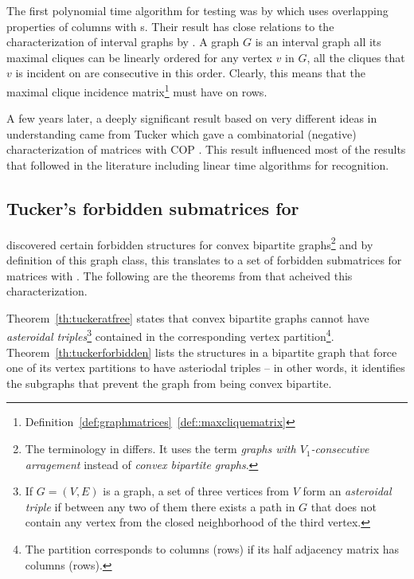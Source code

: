 The first polynomial time algorithm for \COP testing was by
\cite{fg65} which uses overlapping properties of columns with \un
s. Their result has close relations to the characterization of
interval graphs by \cite{gh64}. A graph $G$ is an interval graph \iff
all its maximal cliques can be linearly ordered \stt for any vertex
$v$ in $G$, all the cliques that $v$ is incident on are consecutive in
this order. Clearly, this means that the maximal clique incidence
matrix\footnote{
  Definition~\ref{def:graphmatrices}~\ref{def::maxcliquematrix}} must
have \COP on rows.

A few years later, a deeply significant result based on very different
ideas in understanding \COP came from Tucker which gave a
combinatorial (negative) characterization of matrices with COP
\cite{at72}. This result influenced most of the \COP results that
followed in the literature including linear time
algorithms for \COP
recognition.


\subsection{Tucker's forbidden submatrices for \COP}


\cite{at72} discovered certain forbidden structures for convex
bipartite graphs\footnote{The terminology in \cite{at72} differs. It
  uses the term {\em graphs with $V_1$-consecutive arragement} instead
  of {\em convex bipartite graphs}.} and by definition of this graph
class, this translates to a set of forbidden submatrices for matrices
with \cop.  The following are the theorems from \cite{at72} that
acheived this characterization.


Theorem~\ref{th:tuckeratfree} states that convex bipartite graphs
cannot have {\em asteroidal triples}\footnote{If $G = (V,E)$ is a
  graph, a set of three vertices from $V$ form an {\em asteroidal
    triple} if between any two of them there exists a path in $G$ that
  does not contain any vertex from the closed neighborhood of the
  third vertex.} contained in the corresponding vertex
partition\footnote{The partition corresponds to columns (rows) if its
  half adjacency matrix has \COP columns (rows).}.
Theorem~\ref{th:tuckerforbidden} lists the structures in a
bipartite graph that force one of its vertex partitions to have
asteriodal triples -- in other words, it identifies the subgraphs that
prevent the graph from being convex bipartite.


